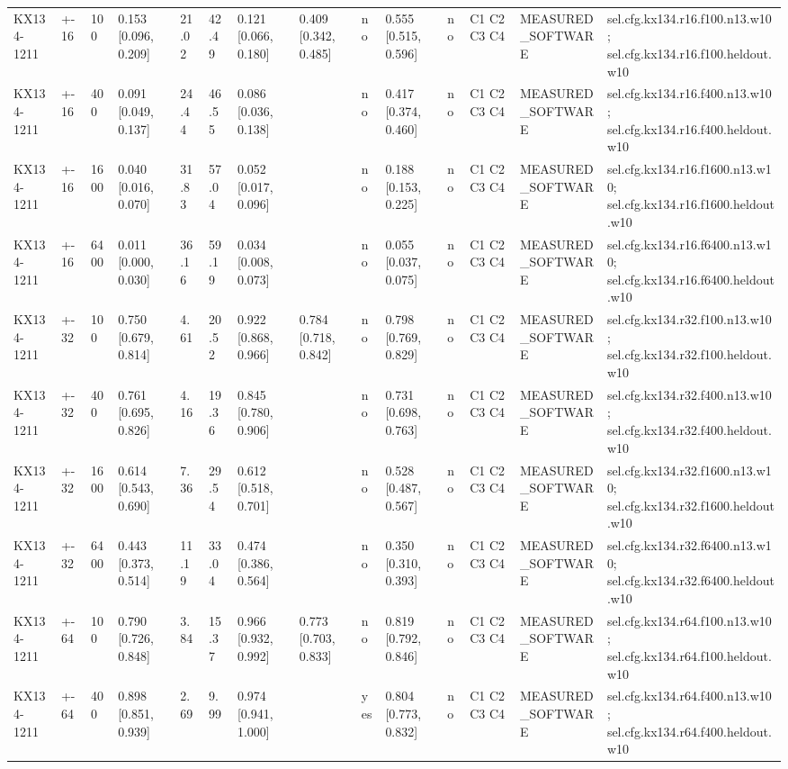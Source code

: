 \begin{table}[t]
\begin{tabular}{llllllllllllll}
KX134-1211 & +-16 & 100 & 0.153 [0.096, 0.209] & 21.02 & 42.49 & 0.121 [0.066, 0.180] & 0.409 [0.342, 0.485] & no & 0.555 [0.515, 0.596] & no & C1 C2 C3 C4 & MEASURED\_SOFTWARE & sel.cfg.kx134.r16.f100.n13.w10; sel.cfg.kx134.r16.f100.heldout.w10 \\
KX134-1211 & +-16 & 400 & 0.091 [0.049, 0.137] & 24.44 & 46.55 & 0.086 [0.036, 0.138] &  & no & 0.417 [0.374, 0.460] & no & C1 C2 C3 C4 & MEASURED\_SOFTWARE & sel.cfg.kx134.r16.f400.n13.w10; sel.cfg.kx134.r16.f400.heldout.w10 \\
KX134-1211 & +-16 & 1600 & 0.040 [0.016, 0.070] & 31.83 & 57.04 & 0.052 [0.017, 0.096] &  & no & 0.188 [0.153, 0.225] & no & C1 C2 C3 C4 & MEASURED\_SOFTWARE & sel.cfg.kx134.r16.f1600.n13.w10; sel.cfg.kx134.r16.f1600.heldout.w10 \\
KX134-1211 & +-16 & 6400 & 0.011 [0.000, 0.030] & 36.16 & 59.19 & 0.034 [0.008, 0.073] &  & no & 0.055 [0.037, 0.075] & no & C1 C2 C3 C4 & MEASURED\_SOFTWARE & sel.cfg.kx134.r16.f6400.n13.w10; sel.cfg.kx134.r16.f6400.heldout.w10 \\
KX134-1211 & +-32 & 100 & 0.750 [0.679, 0.814] & 4.61 & 20.52 & 0.922 [0.868, 0.966] & 0.784 [0.718, 0.842] & no & 0.798 [0.769, 0.829] & no & C1 C2 C3 C4 & MEASURED\_SOFTWARE & sel.cfg.kx134.r32.f100.n13.w10; sel.cfg.kx134.r32.f100.heldout.w10 \\
KX134-1211 & +-32 & 400 & 0.761 [0.695, 0.826] & 4.16 & 19.36 & 0.845 [0.780, 0.906] &  & no & 0.731 [0.698, 0.763] & no & C1 C2 C3 C4 & MEASURED\_SOFTWARE & sel.cfg.kx134.r32.f400.n13.w10; sel.cfg.kx134.r32.f400.heldout.w10 \\
KX134-1211 & +-32 & 1600 & 0.614 [0.543, 0.690] & 7.36 & 29.54 & 0.612 [0.518, 0.701] &  & no & 0.528 [0.487, 0.567] & no & C1 C2 C3 C4 & MEASURED\_SOFTWARE & sel.cfg.kx134.r32.f1600.n13.w10; sel.cfg.kx134.r32.f1600.heldout.w10 \\
KX134-1211 & +-32 & 6400 & 0.443 [0.373, 0.514] & 11.19 & 33.04 & 0.474 [0.386, 0.564] &  & no & 0.350 [0.310, 0.393] & no & C1 C2 C3 C4 & MEASURED\_SOFTWARE & sel.cfg.kx134.r32.f6400.n13.w10; sel.cfg.kx134.r32.f6400.heldout.w10 \\
KX134-1211 & +-64 & 100 & 0.790 [0.726, 0.848] & 3.84 & 15.37 & 0.966 [0.932, 0.992] & 0.773 [0.703, 0.833] & no & 0.819 [0.792, 0.846] & no & C1 C2 C3 C4 & MEASURED\_SOFTWARE & sel.cfg.kx134.r64.f100.n13.w10; sel.cfg.kx134.r64.f100.heldout.w10 \\
KX134-1211 & +-64 & 400 & 0.898 [0.851, 0.939] & 2.69 & 9.99 & 0.974 [0.941, 1.000] &  & yes & 0.804 [0.773, 0.832] & no & C1 C2 C3 C4 & MEASURED\_SOFTWARE & sel.cfg.kx134.r64.f400.n13.w10; sel.cfg.kx134.r64.f400.heldout.w10 \\

\end{tabular}
\end{table}
